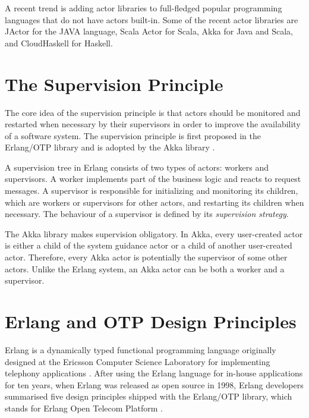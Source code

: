 A recent trend is adding actor libraries to full-fledged popular programming 
languages that do not have actors built-in.  Some of the recent actor libraries 
are JActor  \citep{JActor} for the JAVA language, Scala Actor \citep{actor_1, 
actor_2} for Scala, Akka \citep{akka_doc} for Java and Scala, and CloudHaskell 
\citep{CloudHaskell} for Haskell.


\section{The Supervision Principle}
\label{supervision_principle}

The core idea of the supervision principle is that actors should 
be monitored and restarted when necessary by their supervisors in order to 
improve the availability of a software system.  The supervision principle is 
first proposed in the Erlang/OTP library \citep{OTP} and is adopted by the Akka 
library \citep{akka_doc}.

A supervision tree in Erlang consists of two types of actors: workers and 
supervisors. A worker implements part of the business logic and reacts to 
request messages.  A supervisor is responsible for initializing and monitoring 
its children, which are workers or supervisors for other actors, and restarting 
its children when necessary.  The behaviour of a supervisor is defined by its 
{\it supervision strategy}.

The Akka library makes supervision obligatory.  In Akka, every user-created 
actor is either a child of the system guidance actor or a child of another 
user-created actor.  Therefore, every Akka actor is potentially the supervisor 
of some other actors.  Unlike the Erlang system, an Akka actor can be 
both a worker and a supervisor.





\section{Erlang and OTP Design Principles}
\label{erlang_otp}

Erlang \citep{erlang_history, ArmstrongErlang} is a dynamically typed 
functional programming language originally designed at the Ericsson Computer 
Science Laboratory for implementing telephony applications 
\citep{erlang_history}.  After using the Erlang language for in-house 
applications for ten years, when Erlang was released as open source in 1998, 
Erlang developers summarised five design principles shipped with the Erlang/OTP 
library, which stands for Erlang Open Telecom Platform \citep{erlang_history, 
OTP}.

